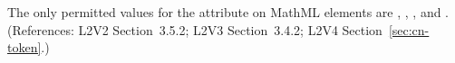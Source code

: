 The only permitted values for the  attribute on MathML
 elements are , , , and
.  (References: L2V2 Section~3.5.2; L2V3 Section~3.4.2;
L2V4 Section~\ref{sec:cn-token}.)
